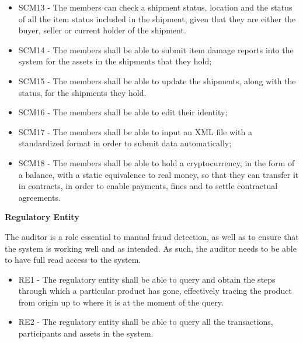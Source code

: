 \begin{itemize}
			\item SCM13 - The members can check a shipment status, location and the status of all the item status included in the shipment, given that they are either the buyer, seller or current holder of the shipment. %
			\item SCM14 - The members shall be able to submit item damage reports into the system for the assets in the shipments that they hold;
			\item SCM15 - The members shall be able to update the shipments, along with the status, for the shipments they hold.
			\item SCM16 - The members shall be able to edit their identity;%
			\item SCM17 - The members shall be able to input an XML file with a standardized format in order to submit data automatically;
			\item SCM18 - The members shall be able to hold a cryptocurrency, in the form of a balance, with a static equivalence to real money, so that they can transfer it in contracts, in order to enable payments, fines and to settle contractual agreements. %
        \end{itemize}

		\par \textbf{Regulatory Entity}
		
		The auditor is a role essential to manual fraud detection, as well as to ensure that the system is working well and as intended. As such, the auditor needs to be able to have full read access to the system.

        \begin{itemize}
			\item RE1 - The regulatory entity shall be able to query and obtain the steps through which a particular product has gone, effectively tracing the product from origin up to where it is at the moment of the query.  %
			\item RE2 - The regulatory entity shall be able to query all the transactions, participants and assets in the system. %
        \end{itemize}
		
